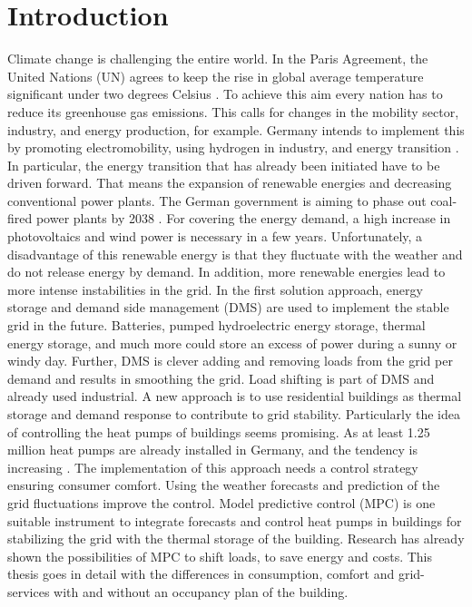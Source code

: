 \chapter{Introduction}
\label{ch:introduction}
Climate change is challenging the entire world. In the Paris Agreement, the United Nations (UN) agrees to keep the rise in global average temperature significant under two degrees Celsius \cite{UnitedNations.2015}. To achieve this aim every nation has to reduce its greenhouse gas emissions. This calls for changes in the mobility sector, industry, and energy production, for example. Germany intends to implement this by promoting electromobility, using hydrogen in industry, and energy transition \cite{Deutschlandfunk.24.06.2021}. In particular, the energy transition that has already been initiated have to be driven forward. That means the expansion of renewable energies and decreasing conventional power plants. The German government is aiming to phase out coal-fired power plants by 2038 \cite{bundesregierung.2021}. For covering the energy demand, a high increase in photovoltaics and wind power is necessary in a few years. 
\newline
Unfortunately, a disadvantage of this renewable energy is that they fluctuate with the weather and do not release energy by demand. In addition, more renewable energies lead to more intense instabilities in the grid. In the first solution approach, energy storage and demand side management (DMS) are used to implement the stable grid in the future. Batteries, pumped hydroelectric energy storage, thermal energy storage, and much more could store an excess of power during a sunny or windy day. Further, DMS is clever adding and removing loads from the grid per demand and results in smoothing the grid. Load shifting is part of DMS \cite{Gellings.1985} and already used industrial. A new approach is to use residential buildings as thermal storage and demand response to contribute to grid stability. Particularly the idea of controlling the heat pumps of buildings seems promising. As at least 1.25 million heat pumps are already installed in Germany, and the tendency is increasing \cite{BMW.2021}.
\newline
The implementation of this approach needs a control strategy ensuring consumer comfort. Using the weather forecasts and prediction of the grid fluctuations improve the control. Model predictive control (MPC) is one suitable instrument to integrate forecasts and control heat pumps in buildings for stabilizing the grid with the thermal storage of the building. Research has already shown the possibilities of MPC to shift loads, to save energy and costs. This thesis goes in detail with the differences in consumption, comfort and grid-services with and without an occupancy plan of the building.

